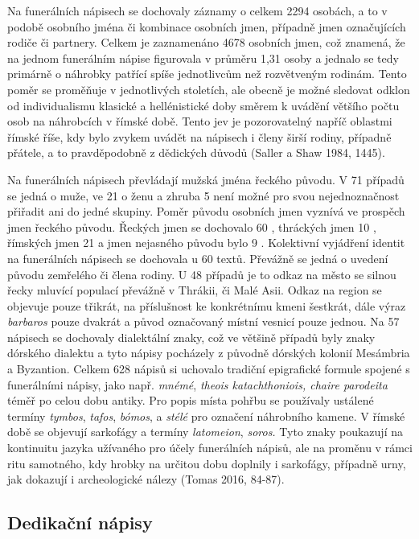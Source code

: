 Na funerálních nápisech se dochovaly záznamy o celkem 2294 osobách, a to v podobě osobního jména či kombinace osobních jmen, případně jmen označujících rodiče či partnery. Celkem je zaznamenáno 4678 osobních jmen, což znamená, že na jednom funerálním nápise figurovala v průměru 1,31 osoby a jednalo se tedy primárně o náhrobky patřící spíše jednotlivcům než rozvětveným rodinám. Tento poměr se proměňuje v jednotlivých stoletích, ale obecně je možné sledovat odklon od individualismu klasické a hellénistické doby směrem k uvádění většího počtu osob na náhrobcích v římské době. Tento jev je pozorovatelný napříč oblastmi římské říše, kdy bylo zvykem uvádět na nápisech i členy širší rodiny, případně přátele, a to pravděpodobně z dědických důvodů (Saller a Shaw 1984, 1445).

Na funerálních nápisech převládají mužská jména řeckého původu. V 71  případů se jedná o muže, ve 21  o ženu a zhruba 5  není možné pro svou nejednoznačnost přiřadit ani do jedné skupiny. Poměr původu osobních jmen vyznívá ve prospěch jmen řeckého původu. Řeckých jmen se dochovalo 60 , thráckých jmen 10 , římských jmen 21  a jmen nejasného původu bylo 9 . Kolektivní vyjádření identit na funerálních nápisech se dochovala u 60 textů. Převážně se jedná o uvedení původu zemřelého či člena rodiny. U 48 případů je to odkaz na město se silnou řecky mluvící populací převážně v Thrákii, či Malé Asii. Odkaz na region se objevuje pouze třikrát, na příslušnost ke konkrétnímu kmeni šestkrát, dále výraz {\em barbaros} pouze dvakrát a původ označovaný místní vesnicí pouze jednou. Na 57 nápisech se dochovaly dialektální znaky, což ve většině případů byly znaky dórského dialektu a tyto nápisy pocházely z původně dórských kolonií Mesámbria a Byzantion. Celkem 628 nápisů si uchovalo tradiční epigrafické formule spojené s funerálními nápisy, jako např. {\em mnémé}, {\em theois katachthoniois, chaire parodeita} téměř po celou dobu antiky. Pro popis místa pohřbu se používaly ustálené termíny {\em tymbos}, {\em tafos}, {\em bómos}, a {\em stélé} pro označení náhrobního kamene. V římské době se objevují sarkofágy a termíny {\em latomeion}, {\em soros.} Tyto znaky poukazují na kontinuitu jazyka užívaného pro účely funerálních nápisů, ale na proměnu v rámci ritu samotného, kdy hrobky na určitou dobu doplnily i sarkofágy, případně urny, jak dokazují i archeologické nálezy (Tomas 2016, 84-87).

\subsection[dedikační-nápisy]{Dedikační nápisy}

